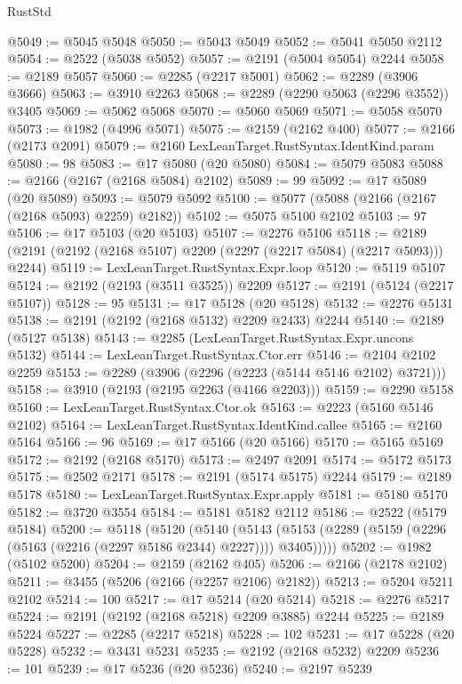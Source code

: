 \begin{lexlean}{RustStd}
\begin{coremodule}
@5049 := @5045 @5048
@5050 := @5043 @5049
@5052 := @5041 @5050 @2112
@5054 := @2522 (@5038 @5052)
@5057 := @2191 (@5004 @5054) @2244
@5058 := @2189 @5057
@5060 := @2285 (@2217 @5001)
@5062 := @2289 (@3906 @3666)
@5063 := @3910 @2263
@5068 := @2289 (@2290 @5063 (@2296 @3552)) @3405
@5069 := @5062 @5068
@5070 := @5060 @5069
@5071 := @5058 @5070
@5073 := @1982 (@4996 @5071)
@5075 := @2159 (@2162 @400)
@5077 := @2166 (@2173 @2091)
@5079 := @2160 LexLeanTarget.RustSyntax.IdentKind.param
@5080 := 98
@5083 := @17 @5080 (@20 @5080)
@5084 := @5079 @5083
@5088 := @2166 (@2167 (@2168 @5084) @2102)
@5089 := 99
@5092 := @17 @5089 (@20 @5089)
@5093 := @5079 @5092
@5100 := @5077 (@5088 (@2166 (@2167 (@2168 @5093) @2259) @2182))
@5102 := @5075 @5100 @2102
@5103 := 97
@5106 := @17 @5103 (@20 @5103)
@5107 := @2276 @5106
@5118 := @2189 (@2191 (@2192 (@2168 @5107) @2209 (@2297 (@2217 @5084) (@2217 @5093))) @2244)
@5119 := LexLeanTarget.RustSyntax.Expr.loop
@5120 := @5119 @5107
@5124 := @2192 (@2193 (@3511 @3525)) @2209
@5127 := @2191 (@5124 (@2217 @5107))
@5128 := 95
@5131 := @17 @5128 (@20 @5128)
@5132 := @2276 @5131
@5138 := @2191 (@2192 (@2168 @5132) @2209 @2433) @2244
@5140 := @2189 (@5127 @5138)
@5143 := @2285 (LexLeanTarget.RustSyntax.Expr.uncons @5132)
@5144 := LexLeanTarget.RustSyntax.Ctor.err
@5146 := @2104 @2102 @2259
@5153 := @2289 (@3906 (@2296 (@2223 (@5144 @5146 @2102) @3721)))
@5158 := @3910 (@2193 (@2195 @2263 (@4166 @2203)))
@5159 := @2290 @5158
@5160 := LexLeanTarget.RustSyntax.Ctor.ok
@5163 := @2223 (@5160 @5146 @2102)
@5164 := LexLeanTarget.RustSyntax.IdentKind.callee
@5165 := @2160 @5164
@5166 := 96
@5169 := @17 @5166 (@20 @5166)
@5170 := @5165 @5169
@5172 := @2192 (@2168 @5170)
@5173 := @2497 @2091
@5174 := @5172 @5173
@5175 := @2502 @2171
@5178 := @2191 (@5174 @5175) @2244
@5179 := @2189 @5178
@5180 := LexLeanTarget.RustSyntax.Expr.apply
@5181 := @5180 @5170
@5182 := @3720 @3554
@5184 := @5181 @5182 @2112
@5186 := @2522 (@5179 @5184)
@5200 := @5118
    (@5120
      (@5140
        (@5143 (@5153 (@2289 (@5159 (@2296 (@5163 (@2216 (@2297 @5186 @2344) @2227)))) @3405)))))
@5202 := @1982 (@5102 @5200)
@5204 := @2159 (@2162 @405)
@5206 := @2166 (@2178 @2102)
@5211 := @3455 (@5206 (@2166 (@2257 @2106) @2182))
@5213 := @5204 @5211 @2102
@5214 := 100
@5217 := @17 @5214 (@20 @5214)
@5218 := @2276 @5217
@5224 := @2191 (@2192 (@2168 @5218) @2209 @3885) @2244
@5225 := @2189 @5224
@5227 := @2285 (@2217 @5218)
@5228 := 102
@5231 := @17 @5228 (@20 @5228)
@5232 := @3431 @5231
@5235 := @2192 (@2168 @5232) @2209
@5236 := 101
@5239 := @17 @5236 (@20 @5236)
@5240 := @2197 @5239

\end{coremodule}
\end{lexlean}
